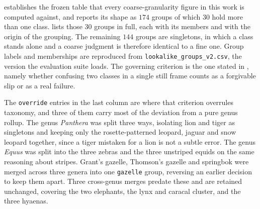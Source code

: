  establishes the frozen table that every coarse-granularity figure in this work is computed against, and reports its shape as $174$ groups of which $30$ hold more than one class.  lists those $30$ groups in full, each with its members and with the origin of the grouping. The remaining $144$ groups are singletons, in which a class stands alone and a coarse judgment is therefore identical to a fine one. Group labels and memberships are reproduced from \texttt{lookalike\_groups\_v2.csv}, the version the evaluation suite loads. The governing criterion is the one stated in , namely whether confusing two classes in a single still frame counts as a forgivable slip or as a real failure.

The \texttt{override} entries in the last column are where that criterion overrules taxonomy, and three of them carry most of the deviation from a pure genus rollup. The genus \textit{Panthera} was split three ways, isolating lion and tiger as singletons and keeping only the rosette-patterned leopard, jaguar and snow leopard together, since a tiger mistaken for a lion is not a subtle error. The genus \textit{Equus} was split into the three zebras and the three unstriped equids on the same reasoning about stripes. Grant's gazelle, Thomson's gazelle and springbok were merged across three genera into one \texttt{gazelle} group, reversing an earlier decision to keep them apart. Three cross-genus merges predate these and are retained unchanged, covering the two elephants, the lynx and caracal cluster, and the three hyaenas.

